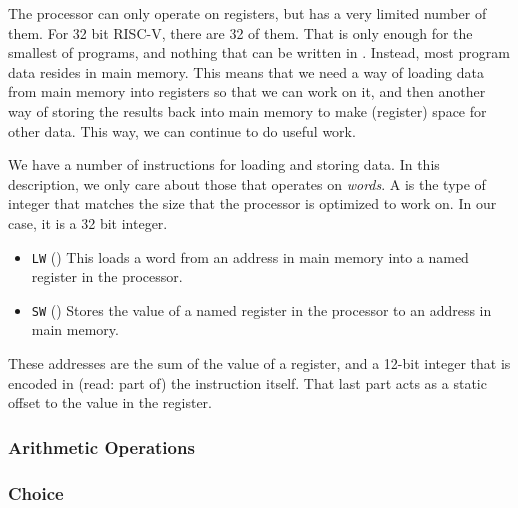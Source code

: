 The processor can only operate on registers, but has a very limited number of them. For 32 bit RISC-V, there are 32 of them. That is only enough for the smallest of programs, and nothing that can be written in \csharp. Instead, most program data resides in main memory. This means that we need a way of loading data from main memory into registers so that we can work on it, and then another way of storing the results back into main memory to make (register) space for other data. This way, we can continue to do useful work.

We have a number of instructions for loading and storing data. In this description, we only care about those that operates on \textsl{words}. A  is the type of integer that matches the size that the processor is optimized to work on. In our case, it is a 32 bit integer.
\begin{itemize}
  \item \texttt{LW} () This loads a word from an address in main memory into a named register in the processor.
  \item \texttt{SW} () Stores the value of a named register in the processor to an address in main memory.
\end{itemize}
These addresses are the sum of the value of a register, and a 12-bit integer that is encoded in (read: part of) the instruction itself. That last part acts as a static offset to the value in the register.

\subsubsection{Arithmetic Operations}




\subsubsection{Choice}


